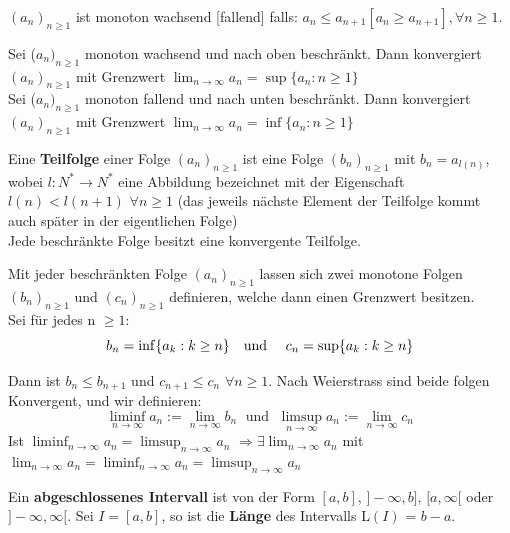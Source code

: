 
\Def $(a_{n})_{n \geq 1}$ ist monoton wachsend [fallend] falls: $a_{n} \leq a_{n+1} 
[a_{n} \geq a_{n+1}], \forall n \geq 1$.

\begin{tcolorbox}
	\Satz Sei ($a_{n})_{n \geq 1}$ monoton wachsend und nach oben beschränkt. Dann konvergiert $(a_{n})_{n \geq 1}$ mit Grenzwert
			$\lim_{n \to \infty} a_{n} = \sup\{a_{n} : n \geq 1\} $ \\
		
		Sei ($a_{n})_{n \geq 1}$ monoton fallend und nach unten beschränkt. Dann konvergiert $(a_{n})_{n \geq 1}$ mit Grenzwert
			$\lim_{n \to \infty} a_{n} = \inf\{a_{n} : n \geq 1\} $
\end{tcolorbox}



\Def Eine \textbf{Teilfolge} einer Folge $(a_{n})_{n \geq 1}$ 
ist eine Folge $(b_{n})_{n \geq 1}$ mit $b_{n} = a_{l(n)}$, wobei $l: 
N^{*} \rightarrow N^{*}$ eine Abbildung bezeichnet mit der Eigenschaft $l(n) < l(n+1)$ 
$\forall n \geq 1$ (das jeweils nächste Element der Teilfolge kommt auch später in der eigentlichen Folge) \\ \smallskip
\Satz Jede beschränkte Folge besitzt eine konvergente Teilfolge.



Mit jeder beschränkten Folge $(a_{n})_{n \geq 1}$ lassen sich zwei monotone Folgen $(b_{n})_{n \geq 1}$ 
und $(c_{n})_{n \geq 1}$ definieren, welche dann einen Grenzwert besitzen. \\
Sei für jedes n $\geq 1$: 
$$b_{n} = \inf\{a_{k} : k \geq n\} \text{\quad und \quad} c_{n} = \sup\{a_{k}: k \geq n\}$$

Dann ist $b_{n} \leq b_{n+1}$ und $c_{n+1} \leq c_{n}$ $\forall n \geq 1$. Nach 
Weierstrass sind beide folgen Konvergent, und wir definieren:
$$\liminf_{n \to \infty} a_{n} := \lim_{n \to \infty} b_{n} \; \text{ und } \; \limsup_{n \to \infty} a_{n} := \lim_{n \to \infty} c_{n}$$
Ist $\liminf_{n \to \infty} a_{n} = \limsup_{n \to \infty} a_{n}$ $\Rightarrow \exists \lim_{n \to \infty} a_{n}$ 
mit $\lim_{n \to \infty} a_{n} = \liminf_{n \to \infty} a_{n} = \limsup_{n \to \infty} a_{n}$

\Def Ein \textbf{abgeschlossenes Intervall} ist von der Form $[a,b]$, $]-\infty, b]$, $[a,\infty[$
oder $]-\infty, \infty[$. Sei $I = [a,b]$, so ist die \textbf{Länge} des Intervalls L$(I)$ = $b - a$. 

